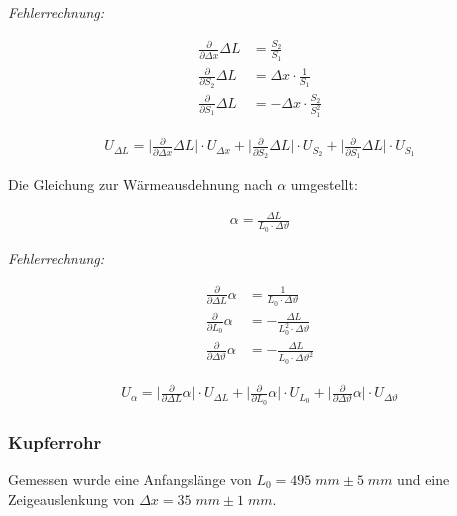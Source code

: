 \documentclass[a4paper]{scrartcl}
\numberwithin{equation}{subsection}
\begin{document}
\textit{Fehlerrechnung:}

\begin{align*}
\frac{\partial}{\partial \Delta x} \Delta L &= \frac{S_2}{S_1} \\
\frac{\partial}{\partial S_2} \Delta L      &= \Delta x \cdot \frac{1}{S_1} \\
\frac{\partial}{\partial S_1} \Delta L      &= - \Delta x \cdot \frac{S_2}{S_1^2}
\end{align*}

\begin{align*}
U_{\Delta L} = \bigg | \frac{\partial}{\partial \Delta x} \Delta L \bigg | \cdot U_{\Delta x} + \bigg | \frac{\partial}{\partial S_2} \Delta L \bigg | \cdot U_{S_2} + \bigg | \frac{\partial}{\partial S_1} \Delta L \bigg | \cdot U_{S_1}
\end{align*}

Die Gleichung zur Wärmeausdehnung nach $\alpha$ umgestellt:

\begin{align}
\alpha = \frac{\Delta L}{L_0 \cdot \Delta \vartheta}
\end{align}

\textit{Fehlerrechnung:}

\begin{align*}
\frac{\partial}{\partial \Delta L} \alpha         &= \frac{1}{L_0 \cdot \Delta \vartheta} \\
\frac{\partial}{\partial L_0} \alpha              &= - \frac{\Delta L}{L_0^2 \cdot \Delta \vartheta} \\
\frac{\partial}{\partial \Delta \vartheta} \alpha &= - \frac{\Delta L}{L_0 \cdot \Delta \vartheta^2}
\end{align*}

\begin{align*}
U_{\alpha} = \bigg | \frac{\partial}{\partial \Delta L} \alpha \bigg | \cdot U_{\Delta L} + \bigg | \frac{\partial}{\partial L_0} \alpha \bigg | \cdot U_{L_0} + \bigg | \frac{\partial}{\partial \Delta \vartheta} \alpha \bigg | \cdot U_{\Delta \vartheta}
\end{align*}

\subsubsection{Kupferrohr}

Gemessen wurde eine Anfangslänge von $L_0 = 495 \;mm \pm 5 \;mm $ und eine Zeigeauslenkung von $\Delta x = 35 \;mm \pm 1 \;mm$.\\
\end{document}
